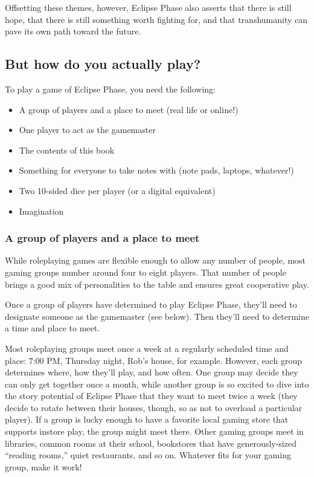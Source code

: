 Offsetting these themes, however, Eclipse Phase also asserts that
there is still hope, that there is still something worth fighting for,
and that transhumanity can pave its own path toward the future.

\subsection{But how do you actually play?}
\label{sec:but-how-do}

To play a game of Eclipse Phase, you need the following:

\begin{itemize}
\item A group of players and a place to meet (real life or online!)
\item One player to act as the gamemaster
\item The contents of this book
\item Something for everyone to take notes with (note pads, laptops,
  whatever!)
\item Two 10-sided dice per player (or a digital equivalent)
\item Imagination
\end{itemize}

\subsubsection{A group of players and a place to meet}

While roleplaying games are flexible enough to allow any number of
people, most gaming groups number around four to eight players. That
number of people brings a good mix of personalities to the table and
ensures great cooperative play.

Once a group of players have determined to play Eclipse Phase, they'll
need to designate someone as the gamemaster (see below). Then they'll
need to determine a time and place to meet.

Most roleplaying groups meet once a week at a regularly scheduled time
and place: 7:00 PM, Thursday night, Rob's house, for example. However,
each group determines where, how they'll play, and how often.  One
group may decide they can only get together once a month, while
another group is so excited to dive into the story potential of
Eclipse Phase that they want to meet twice a week (they decide to
rotate between their houses, though, so as not to overload a
particular player). If a group is lucky enough to have a favorite
local gaming store that supports instore play, the group might meet
there. Other gaming groups meet in libraries, common rooms at their
school, bookstores that have generously-sized ``reading rooms,'' quiet
restaurants, and so on. Whatever fits for your gaming group, make it
work!

